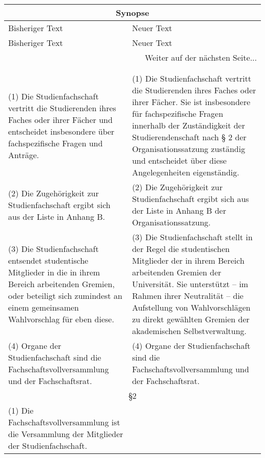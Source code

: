     {\begin{longtable}{|p{7.5cm}|p{7.5cm}|}
        \hline
        \multicolumn{2}{|c|}{Synopse}\\\hline
        Bisheriger Text & Neuer Text \\\hline
        \endfirsthead
        \hline
        Bisheriger Text & Neuer Text \\
        \hline
        \endhead
        \hline
        \multicolumn{2}{|r|}{Weiter auf der nächsten Seite...}\\
        \hline
        \endfoot
        \hline
        \multicolumn{2}{c}{Ende der Synopse} \\
        \endlastfoot
        \multicolumn{2}{|c|}{§1}\\\hline
        (1) Die Studienfachschaft vertritt die Studierenden ihres Faches oder ihrer Fächer und
        entscheidet insbesondere über fachspezifische Fragen und Anträge.&
        (1) Die Studienfachschaft vertritt die Studierenden ihres Faches oder ihrer Fächer.
        Sie ist insbesondere für fachspezifische Fragen innerhalb der Zuständigkeit der
        Studierendenschaft nach § 2 der Organisationssatzung zuständig und entscheidet über
        diese Angelegenheiten eigenständig.\\
        (2) Die Zugehörigkeit zur Studienfachschaft ergibt sich aus der Liste in Anhang B.&
        (2) Die Zugehörigkeit zur Studienfachschaft ergibt sich aus der Liste in Anhang B
        der Organisationssatzung.\\
        (3) Die Studienfachschaft entsendet studentische Mitglieder in die in ihrem Bereich arbeitenden
        Gremien, oder beteiligt sich zumindest an einem gemeinsamen Wahlvorschlag für eben diese.&
        (3) Die Studienfachschaft stellt in der Regel die studentischen Mitglieder der in
        ihrem Bereich arbeitenden Gremien der Universität. Sie unterstützt – im Rahmen
        ihrer Neutralität – die Aufstellung von Wahlvorschlägen zu direkt gewählten
        Gremien der akademischen Selbstverwaltung.\\
        (4) Organe der Studienfachschaft sind die Fachschaftsvollversammlung und der Fachschaftsrat.
        &
        (4) Organe der Studienfachschaft sind die Fachschaftsvollversammlung und
        der Fachschaftsrat.\\\hline
        \multicolumn{2}{|c|}{§2}\\\hline
        (1) Die Fachschaftsvollversammlung ist die Versammlung der Mitglieder der Studienfachschaft.

\end{longtable}}

